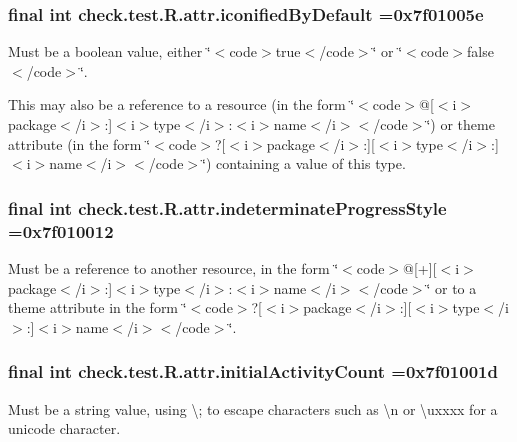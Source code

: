 \subsubsection[{iconified\+By\+Default}]{\setlength{\rightskip}{0pt plus 5cm}final int check.\+test.\+R.\+attr.\+iconified\+By\+Default =0x7f01005e\hspace{0.3cm}{\ttfamily [static]}}\label{classcheck_1_1test_1_1_r_1_1attr_aeb43240baae0ba0739bca74fbbd9e646}
Must be a boolean value, either \char`\"{}$<$code$>$true$<$/code$>$\char`\"{} or \char`\"{}$<$code$>$false$<$/code$>$\char`\"{}. 

This may also be a reference to a resource (in the form \char`\"{}$<$code$>$@\mbox{[}$<$i$>$package$<$/i$>$\+:\mbox{]}$<$i$>$type$<$/i$>$\+:$<$i$>$name$<$/i$>$$<$/code$>$\char`\"{}) or theme attribute (in the form \char`\"{}$<$code$>$?\mbox{[}$<$i$>$package$<$/i$>$\+:\mbox{]}\mbox{[}$<$i$>$type$<$/i$>$\+:\mbox{]}$<$i$>$name$<$/i$>$$<$/code$>$\char`\"{}) containing a value of this type. \hypertarget{classcheck_1_1test_1_1_r_1_1attr_a2582eb7d8088fc5a12dda81d97afd3f6}{}
\subsubsection[{indeterminate\+Progress\+Style}]{\setlength{\rightskip}{0pt plus 5cm}final int check.\+test.\+R.\+attr.\+indeterminate\+Progress\+Style =0x7f010012\hspace{0.3cm}{\ttfamily [static]}}\label{classcheck_1_1test_1_1_r_1_1attr_a2582eb7d8088fc5a12dda81d97afd3f6}
Must be a reference to another resource, in the form \char`\"{}$<$code$>$@\mbox{[}+\mbox{]}\mbox{[}$<$i$>$package$<$/i$>$\+:\mbox{]}$<$i$>$type$<$/i$>$\+:$<$i$>$name$<$/i$>$$<$/code$>$\char`\"{} or to a theme attribute in the form \char`\"{}$<$code$>$?\mbox{[}$<$i$>$package$<$/i$>$\+:\mbox{]}\mbox{[}$<$i$>$type$<$/i$>$\+:\mbox{]}$<$i$>$name$<$/i$>$$<$/code$>$\char`\"{}. \hypertarget{classcheck_1_1test_1_1_r_1_1attr_ae07c86d286d5a2d111131c1aec5f6c98}{}
\subsubsection[{initial\+Activity\+Count}]{\setlength{\rightskip}{0pt plus 5cm}final int check.\+test.\+R.\+attr.\+initial\+Activity\+Count =0x7f01001d\hspace{0.3cm}{\ttfamily [static]}}\label{classcheck_1_1test_1_1_r_1_1attr_ae07c86d286d5a2d111131c1aec5f6c98}
Must be a string value, using \textquotesingle{}\textbackslash{};\textquotesingle{} to escape characters such as \textquotesingle{}\textbackslash{}n\textquotesingle{} or \textquotesingle{}\textbackslash{}uxxxx\textquotesingle{} for a unicode character. 

